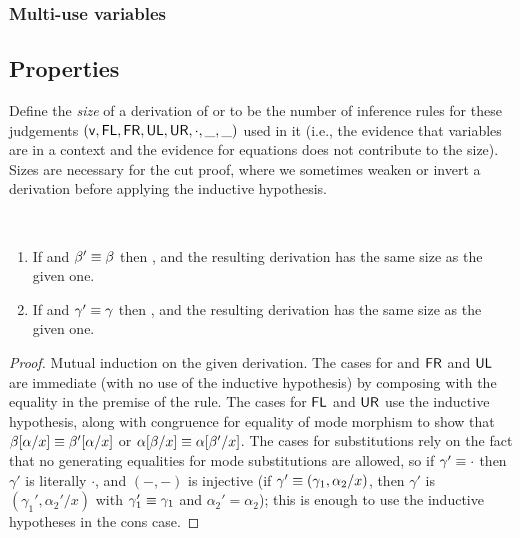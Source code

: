 \subsubsection{Multi-use variables}

\subsection{Properties}

Define the \emph{size} of a derivation of  or
\seq{\Gamma}{\gamma}{\Delta} to be the number of inference rules for
these judgements $(\mathsf{v},\mathsf{FL}, \mathsf{FR}, \mathsf{UL}, \mathsf{UR},
\cdot, \_,\_)$ used in it (i.e., the evidence that variables are in a
context and the evidence for equations does not contribute to the size).
Sizes are necessary for the cut proof, where we sometimes weaken or
invert a derivation before applying the inductive hypothesis.

\begin{lemma} ~
\begin{enumerate}
\item If  and $\beta' \equiv \beta$ then
, and the resulting derivation has the same size
as the given one.
\item If \seq{\Gamma}{\gamma}{\Delta} and $\gamma' \equiv \gamma$ then
  , and the resulting derivation has the
  same size as the given one.
\end{enumerate}
\end{lemma}
\begin{proof}
Mutual induction on the given derivation.  The cases for  and
$\mathsf{FR}$ and $\mathsf{UL}$ are immediate (with no use of the inductive
hypothesis) by composing with the equality in the premise of the rule.
The cases for $\mathsf{FL}$ and $\mathsf{UR}$ use the inductive hypothesis,
along with congruence for equality of mode morphism to show that
$\beta[\alpha/x] \equiv \beta'[\alpha/x]$ or
$\alpha[\beta/x] \equiv \alpha[\beta'/x]$.  The cases
for substitutions rely on the fact that no generating equalities for
mode substitutions are allowed, so if $\gamma' \equiv \cdot$ then
$\gamma'$ is literally $\cdot$, and $(-,-)$ is injective (if $\gamma'
\equiv (\gamma_1,\alpha_2/x)$, then $\gamma'$ is $(\gamma_1',\alpha_2'/x)$
with $\gamma_1' \equiv \gamma_1$ and $\alpha_2' = \alpha_2$); this is
enough to use the inductive hypotheses in the cons case.  
\end{proof}

